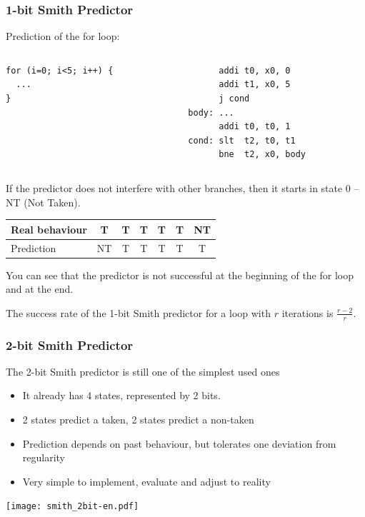 \documentclass{beamer}
\begin{document}
\begin{frame}[fragile,shrink=1]
\frametitle{1-bit Smith Predictor}

Prediction of the for loop:

\begin{columns}[T]
\begin{column}{0.35\textwidth}
\begin{verbatim}
for (i=0; i<5; i++) {
  ...
}
\end{verbatim}
\end{column}
\hfill
\begin{column}{0.45\textwidth}
\begin{verbatim}
      addi t0, x0, 0
      addi t1, x0, 5
      j cond
body: ...
      addi t0, t0, 1
cond: slt  t2, t0, t1
      bne  t2, x0, body
\end{verbatim}
\end{column}
\end{columns}
\bigskip
If the predictor does not interfere with other branches, then it starts in state 0 -- NT (Not Taken).

\begin{tabular}{|l|c|c|c|c|c|c|}\hline
Real behaviour & T & T & T & T & T & NT\\\hline
Prediction & {\color{red}NT} & T & T & T & T & {\color{red}T}\\\hline
\end{tabular}

You can see that the predictor is not successful at the beginning of the for loop and at the end.

The success rate of the 1-bit Smith predictor for a loop with $r$ iterations is $\frac{r-2}{r}$.
\end{frame}


\begin{frame}
\frametitle{2-bit Smith Predictor}

The 2-bit Smith predictor is still one of the simplest used ones
\begin{itemize}
\item It already has 4 states, represented by 2 bits.
\item 2 states predict a taken, 2 states predict a non-taken
\item Prediction depends on past behaviour, but tolerates one deviation from regularity
\item Very simple to implement, evaluate and adjust to reality
\end{itemize}

\begin{center}
\texttt{[image: smith\_2bit-en.pdf]}
\end{center}
\end{frame}
\end{document}
